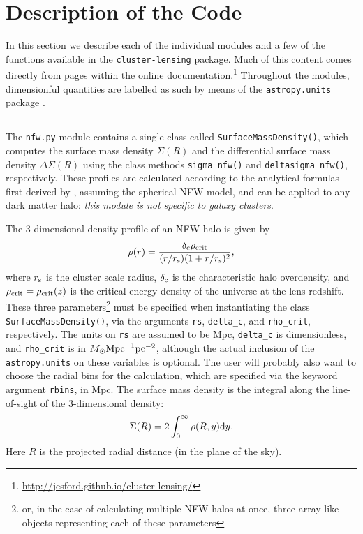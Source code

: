 \documentclass[twocolumn]{aastex6}
\newcommand{\code}{\lstinline[style=codeintext]}
\newcommand{\hcode}{\large\normalfont\texttt} %
\begin{document}

\section{Description of the Code}
\label{code}

In this section we describe each of the individual modules and a few of the functions available in the \code{cluster-lensing} package. Much of this content comes directly from pages within the online documentation.\footnote{\url{http://jesford.github.io/cluster-lensing/}} Throughout the modules, dimensionful quantities are labelled as such by means of the \code{astropy.units} package \citep{astropy13}.


\subsection{\normalfont{\hcode{nfw.py}}}
\label{nfw}

The \code{nfw.py} module contains a single class called \code{SurfaceMassDensity()}, which computes the surface mass density $\Sigma(R)$ and the differential surface mass density $\Delta\Sigma(R)$ using the class methods \code{sigma_nfw()} and \code{deltasigma_nfw()}, respectively. These profiles are calculated according to the analytical formulas first derived by \citet{Wright00}, assuming the spherical NFW model, and can be applied to any dark matter halo: \emph{this module is not specific to galaxy clusters}. 

The 3-dimensional density profile of an NFW halo is given by 
\begin{equation}\label{nfw3d}
\rho(r) = \frac{\delta_{\rm c} \rho_{\rm crit}}{(r/r_{\rm s})(1+r/r_{\rm s})^2},
\end{equation}
where $r_{\rm s}$ is the cluster scale radius, $\delta_{\rm c}$ is the characteristic halo overdensity, and $\rho_{\rm crit} = \rho_{\rm crit}(z)$ is the critical energy density of the universe at the lens redshift. These three parameters\footnote{or, in the case of calculating multiple NFW halos at once, three array-like objects representing each of these parameters} must be specified when instantiating the class \code{SurfaceMassDensity()}, via the arguments \code{rs}, \code{delta_c}, and \code{rho_crit}, respectively. The units on \code{rs} are assumed to be Mpc, \code{delta_c} is dimensionless, and \code{rho_crit} is in $M_{\odot}{\rm Mpc}^{-1}{\rm pc}^{-2}$, although the actual inclusion of the \code{astropy.units} on these variables is optional. The user will probably also want to choose the radial bins for the calculation, which are specified via the keyword argument \code{rbins}, in Mpc. The surface mass density is the integral along the line-of-sight of the 3-dimensional density:
\begin{equation}
\Sigma(R) = 2 \int_0^{\infty} \rho(R,y) {\rm d}y.
\end{equation}
Here $R$ is the projected radial distance (in the plane of the sky).  
\end{document}
